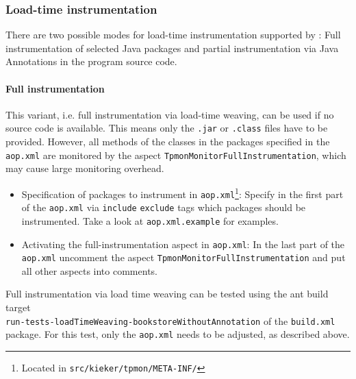 \documentclass[a4paper,12pt]{scrartcl}
\begin{document}
%
%
\subsubsection{Load-time instrumentation}
There are two possible modes for load-time instrumentation supported by \tpmon{}:
 Full instrumentation of selected Java packages and partial instrumentation via Java Annotations
in the program source code.
\paragraph{Full instrumentation}
This variant, i.e. full instrumentation via load-time weaving, can be used if no source code is available. This means only the \texttt{.jar} or \texttt{.class} files have to be provided. However, all methods of the classes in the packages specified in the \texttt{aop.xml} are monitored by the aspect \texttt{TpmonMonitorFullInstrumentation}, which may cause large monitoring overhead.

\begin{itemize}
 \item Specification of packages to instrument in \texttt{aop.xml}\footnote{Located in \texttt{src/kieker/tpmon/META-INF/}}: Specify in the first part of the \texttt{aop.xml} via \texttt{include} \texttt{exclude} tags which packages should be instrumented. Take a look at  \texttt{aop.xml.example} for examples.
\item Activating the full-instrumentation aspect in \texttt{aop.xml}: In the last part of the \texttt{aop.xml} uncomment the aspect \texttt{TpmonMonitorFullInstrumentation} and put all other aspects into comments.
\end{itemize}

Full instrumentation via load time weaving can be tested using the ant build target \\ \small \texttt{run-tests-loadTimeWeaving-bookstoreWithoutAnnotation} \normalsize of the \texttt{build.xml} \tpmon{} package. For this test, only the \texttt{aop.xml} needs to be adjusted, as described above.
\end{document}
